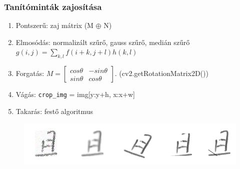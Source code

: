 \documentclass{beamer}
\begin{document}
\begin{frame}[fragile]
\frametitle{Tanítóminták zajosítása}
\begin{enumerate}
\item Pontszerű: zaj mátrix (M $\oplus$ N)
\item Elmosódás: normalizált szűrő, gauss szűrő, medián szűrő $
g(i, j) = \sum_{k, l} f(i + k, j + l) h(k, l)
$
\item Forgatás: $
M = \begin{bmatrix} cos\theta & -sin\theta \\ sin\theta & cos\theta   \end{bmatrix}.
$ (cv2.getRotationMatrix2D())
\item Vágás: \lstinline{crop_img} = img[y:y+h, x:x+w]\lstinline{}
\item Takarás: festő algoritmus
\end{enumerate}
\begin{figure}[h]
\centering
\includegraphics[scale=0.5]{noises}
\end{figure}
\end{frame}
\end{document}
